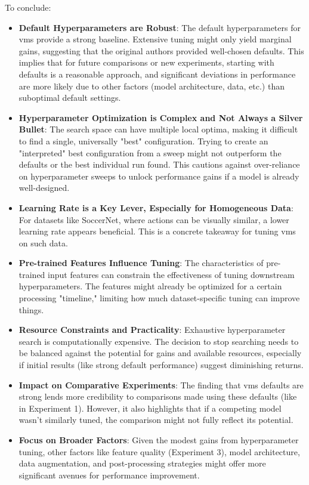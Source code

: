 
To conclude:
\begin{itemize}
    \item \textbf{Default Hyperparameters are Robust}: The default hyperparameters for \acrshort{vms} provide a strong baseline. Extensive tuning might only yield marginal gains, suggesting that the original authors provided well-chosen defaults. This implies that for future comparisons or new experiments, starting with defaults is a reasonable approach, and significant deviations in performance are more likely due to other factors (model architecture, data, etc.) than suboptimal default settings.
    \item \textbf{Hyperparameter Optimization is Complex and Not Always a Silver Bullet}: The search space can have multiple local optima, making it difficult to find a single, universally "best" configuration. Trying to create an "interpreted" best configuration from a sweep might not outperform the defaults or the best individual run found. This cautions against over-reliance on hyperparameter sweeps to unlock performance gains if a model is already well-designed.
    \item \textbf{Learning Rate is a Key Lever, Especially for Homogeneous Data}: For datasets like SoccerNet, where actions can be visually similar, a lower learning rate appears beneficial. This is a concrete takeaway for tuning \acrshort{vms} on such data.
    \item \textbf{Pre-trained Features Influence Tuning}: The characteristics of pre-trained input features can constrain the effectiveness of tuning downstream hyperparameters. The features might already be optimized for a certain processing "timeline," limiting how much dataset-specific tuning can improve things.
    \item \textbf{Resource Constraints and Practicality}: Exhaustive hyperparameter search is computationally expensive. The decision to stop searching needs to be balanced against the potential for gains and available resources, especially if initial results (like strong default performance) suggest diminishing returns.
    \item \textbf{Impact on Comparative Experiments}: The finding that \acrshort{vms} defaults are strong lends more credibility to comparisons made using these defaults (like in Experiment 1). However, it also highlights that if a competing model wasn't similarly tuned, the comparison might not fully reflect its potential.
    \item \textbf{Focus on Broader Factors}: Given the modest gains from hyperparameter tuning, other factors like feature quality (Experiment 3), model architecture, data augmentation, and post-processing strategies might offer more significant avenues for performance improvement.
\end{itemize}


